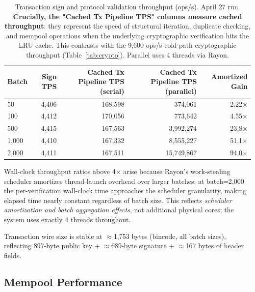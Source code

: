 \documentclass[11pt,a4paper]{article}
\begin{document}
\begin{table}[h]
\centering
\small
\begin{tabular}{@{}lrrrr@{}}
\toprule
\textbf{Batch} & \textbf{Sign TPS} & \textbf{Cached Tx Pipeline TPS (serial)} & \textbf{Cached Tx Pipeline TPS (parallel)} & \textbf{Amortized Gain} \\
\midrule
50    & 4,406 & 168,598 & 374,061   & 2.22$\times$ \\
100   & 4,412 & 170,056 & 773,642   & 4.55$\times$ \\
500   & 4,415 & 167,563 & 3,992,274 & 23.8$\times$ \\
1,000 & 4,410 & 167,332 & 8,555,227 & 51.1$\times$ \\
2,000 & 4,411 & 167,511 & 15,749,867 & 94.0$\times$ \\
\bottomrule
\end{tabular}
\caption{Transaction sign and protocol validation throughput (ops/s). April 27 run. 
\textbf{Crucially, the "Cached Tx Pipeline TPS" columns measure cached throughput}: they represent the speed of structural iteration, duplicate checking, and mempool operations when the underlying cryptographic verification hits the LRU cache. This contrasts with the 9,600 ops/s cold-path cryptographic throughput (Table~\ref{tab:crypto}). Parallel uses 4 threads via Rayon.}
\label{tab:tps}
\end{table}

Wall-clock throughput ratios above 4$\times$ arise because
Rayon's work-stealing scheduler amortizes thread-launch overhead over larger
batches; at batch=2,000 the per-verification wall-clock time approaches the
scheduler granularity, making elapsed time nearly constant regardless of batch
size. This reflects \emph{scheduler amortization and batch aggregation effects},
not additional physical cores; the system uses exactly 4 threads throughout.

Transaction wire size is stable at $\approx$1,753 bytes (bincode, all
batch sizes), reflecting 897-byte public key + $\approx$689-byte signature +
$\approx$167 bytes of header fields.

\subsection{Mempool Performance}
\end{document}
